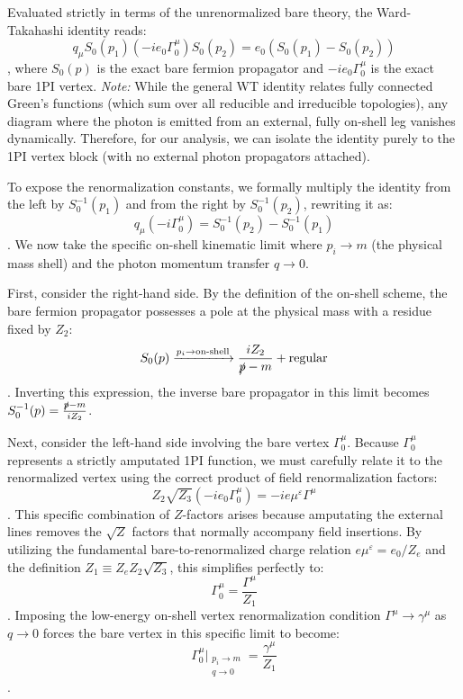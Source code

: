 Evaluated strictly in terms of the unrenormalized bare theory, the Ward-Takahashi identity reads:
\[ q_\mu S_0(p_1) (-ie_0 \Gamma_0^\mu) S_0(p_2) = e_0 (S_0(p_1) - S_0(p_2)) \],
where $S_0(p)$ is the exact bare fermion propagator and $-ie_0 \Gamma_0^\mu$ is the exact bare 1PI vertex.
\textit{Note:} While the general WT identity relates fully connected Green's functions (which sum over all reducible and irreducible topologies), any diagram where the photon is emitted from an external, fully on-shell leg vanishes dynamically. Therefore, for our analysis, we can isolate the identity purely to the 1PI vertex block (with no external photon propagators attached).

To expose the renormalization constants, we formally multiply the identity from the left by $S_0^{-1}(p_1)$ and from the right by $S_0^{-1}(p_2)$, rewriting it as:
\[ q_\mu (-i\Gamma_0^\mu) = S_0^{-1}(p_2) - S_0^{-1}(p_1) \].
We now take the specific on-shell kinematic limit where $p_i \to m$ (the physical mass shell) and the photon momentum transfer $q \to 0$.

First, consider the right-hand side. By the definition of the on-shell scheme, the bare fermion propagator possesses a pole at the physical mass with a residue fixed by $Z_2$:
\[ S_0(p) \xrightarrow{p_i \to \text{on-shell}} \frac{i Z_2}{\slashed{p} - m} + \text{regular} \].
Inverting this expression, the inverse bare propagator in this limit becomes $S_0^{-1}(p) = \frac{\slashed{p} - m}{i Z_2}$.

Next, consider the left-hand side involving the bare vertex $\Gamma_0^\mu$. Because $\Gamma_0^\mu$ represents a strictly amputated 1PI function, we must carefully relate it to the renormalized vertex using the correct product of field renormalization factors:
\[ Z_2 \sqrt{Z_3} (-ie_0 \Gamma_0^\mu) = -i e \mu^\varepsilon \Gamma^\mu \].
This specific combination of $Z$-factors arises because amputating the external lines removes the $\sqrt{Z}$ factors that normally accompany field insertions. By utilizing the fundamental bare-to-renormalized charge relation $e \mu^\varepsilon = e_0 / Z_e$ and the definition $Z_1 \equiv Z_e Z_2 \sqrt{Z_3}$, this simplifies perfectly to:
\[ \Gamma_0^\mu = \frac{\Gamma^\mu}{Z_1} \].
Imposing the low-energy on-shell vertex renormalization condition $\Gamma^\mu \to \gamma^\mu$ as $q \to 0$ forces the bare vertex in this specific limit to become:
\[ \Gamma_0^\mu \Big|_{\substack{p_i \to m \\ q \to 0}} = \frac{\gamma^\mu}{Z_1} \].

